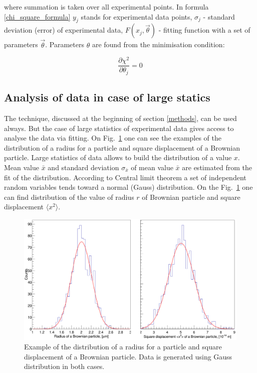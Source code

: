 \documentclass[12pt,a4paper]{report}
\begin{document}
where summation is taken over all experimental points. In formula \ref{chi_square_formula} $y_j$ stands for experimental data points, $\sigma_j$ - standard deviation (error) of experimental data, $F(x_j,\vec{\theta})$ - fitting function with a set of parameters $\vec{\theta}$. Parameters $\theta$ are found from the minimisation condition:

\begin{equation} \label{chi_minimisation_condition}
\frac{\partial \chi^2}{\partial \theta_j} = 0
\end{equation}

\subsection{Analysis of data in case of large statics}
The technique, discussed at the beginning of section \ref{methods}, can be used always. But the case of large statistics of experimental data gives access to analyse the data via fitting. On Fig.~\ref{fig:radius_distribution} one can see the examples of the distribution of a radius for a particle and square displacement of a Brownian particle. Large statistics of data allows to build the distribution of a value $x$. Mean value $\bar{x}$ and standard deviation $\sigma_{\bar{x}}$ of mean value $\bar{x}$ are estimated from the fit of the distribution. According to Central limit theorem a set of independent random variables tends toward a normal (Gauss) distribution. On the Fig.~\ref{fig:radius_distribution} one can find distribution of the value of radius $r$ of Brownian particle and square displacement $\langle x^2 \rangle$.
\begin{figure}[!h]
\begin{center}
\includegraphics*[scale = 0.25]{Figures/two_plots}
\caption{\label{fig:radius_distribution} Example of the distribution of a radius for a particle and square displacement of a Brownian particle. Data is generated using Gauss distribution in both cases.}
\end{center}
\end{figure}
\end{document}

